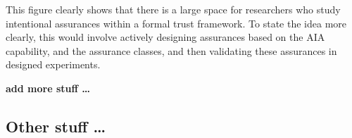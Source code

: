     This figure clearly shows that there is a large space for researchers who study intentional assurances within a formal trust framework. To state the idea more clearly, this would involve actively designing assurances based on the AIA capability, and the assurance classes, and then validating these assurances in designed experiments.

    \textbf{add more stuff \ldots}


\subsection{Other stuff \ldots}
